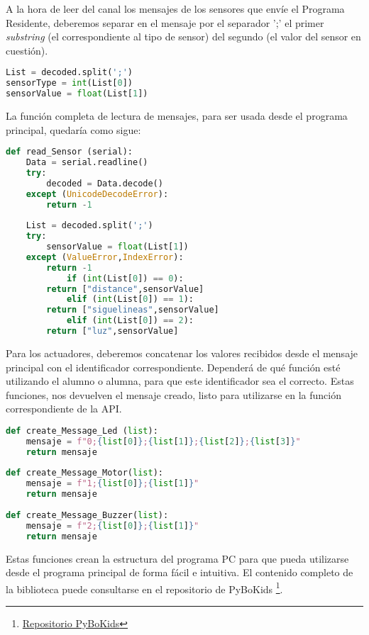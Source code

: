 A la hora de leer del canal los mensajes de los sensores que envíe el Programa Residente, deberemos separar en el mensaje por el separador ';' el primer \textit{substring} (el correspondiente al tipo de sensor) del segundo (el valor del sensor en cuestión).  
\begin{lstlisting}[language=python,caption={Decodificación de un mensaje en Python}]
List = decoded.split(';')
sensorType = int(List[0])
sensorValue = float(List[1])
\end{lstlisting}

La función completa de lectura de mensajes, para ser usada desde el programa principal, quedaría como sigue:

\begin{lstlisting}[language=python,caption={Decodificación de un mensaje en Python}]
def read_Sensor (serial):
	Data = serial.readline()
	try:
		decoded = Data.decode()
	except (UnicodeDecodeError):
		return -1 
	
	List = decoded.split(';')
	try:
		sensorValue = float(List[1])
	except (ValueError,IndexError):
		return -1 
			if (int(List[0]) == 0):
		return ["distance",sensorValue]
			elif (int(List[0]) == 1):
		return ["siguelineas",sensorValue]
			elif (int(List[0]) == 2):
		return ["luz",sensorValue]
\end{lstlisting}


Para los actuadores, deberemos concatenar los valores recibidos desde el mensaje principal con el identificador correspondiente. Dependerá de qué función esté utilizando el alumno o alumna, para que este identificador sea el correcto. Estas funciones, nos devuelven el mensaje creado, listo para utilizarse en la función correspondiente de la API.

\begin{lstlisting}[language=python,caption={Funciones en la biblioteca PC para la codificación de mensajes de los actuadores}]
def create_Message_Led (list):
	mensaje = f"0;{list[0]};{list[1]};{list[2]};{list[3]}"
	return mensaje
	
def create_Message_Motor(list):
	mensaje = f"1;{list[0]};{list[1]}"
	return mensaje
	
def create_Message_Buzzer(list):
	mensaje = f"2;{list[0]};{list[1]}"
	return mensaje
\end{lstlisting}


Estas funciones crean la estructura del programa PC para que pueda utilizarse desde el programa principal de forma fácil e intuitiva. El contenido completo de la biblioteca puede consultarse en el repositorio de PyBoKids  \footnote{\href{https://github.com/JdeRobot/PyBoKids}{Repositorio PyBoKids}}.\\



